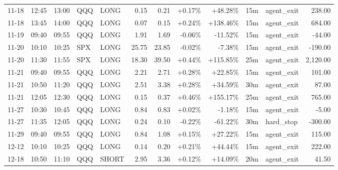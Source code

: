 \documentclass[11pt,a4paper]{article}
\begin{document}
\begin{center}
\begin{longtable}{>{\color{txtmain}}l l l l l r r r r r >{\color{txtmain}}l r}
11-18 & 12:45 & 13:00 & QQQ & LONG & 0.15 & 0.21 & \textcolor{wingreen}{+0.17\%} & \textcolor{wingreen}{+48.28\%} & 15m & agent\_exit & \textcolor{wingreen}{238.00} \\
11-18 & 13:45 & 14:00 & QQQ & LONG & 0.07 & 0.15 & \textcolor{wingreen}{+0.24\%} & \textcolor{wingreen}{+138.46\%} & 15m & agent\_exit & \textcolor{wingreen}{684.00} \\
11-19 & 09:40 & 09:55 & QQQ & LONG & 1.91 & 1.69 & \textcolor{lossred}{-0.06\%} & \textcolor{lossred}{-11.52\%} & 15m & agent\_exit & \textcolor{lossred}{-44.00} \\
11-20 & 10:10 & 10:25 & SPX & LONG & 25.75 & 23.85 & \textcolor{lossred}{-0.02\%} & \textcolor{lossred}{-7.38\%} & 15m & agent\_exit & \textcolor{lossred}{-190.00} \\
11-20 & 11:30 & 11:55 & SPX & LONG & 18.30 & 39.50 & \textcolor{wingreen}{+0.44\%} & \textcolor{wingreen}{+115.85\%} & 25m & agent\_exit & \textcolor{wingreen}{2,120.00} \\
11-21 & 09:40 & 09:55 & QQQ & LONG & 2.21 & 2.71 & \textcolor{wingreen}{+0.28\%} & \textcolor{wingreen}{+22.85\%} & 15m & agent\_exit & \textcolor{wingreen}{101.00} \\
11-21 & 10:50 & 11:20 & QQQ & LONG & 2.51 & 3.38 & \textcolor{wingreen}{+0.28\%} & \textcolor{wingreen}{+34.59\%} & 30m & agent\_exit & \textcolor{wingreen}{87.00} \\
11-21 & 12:05 & 12:30 & QQQ & LONG & 0.15 & 0.37 & \textcolor{wingreen}{+0.46\%} & \textcolor{wingreen}{+155.17\%} & 25m & agent\_exit & \textcolor{wingreen}{765.00} \\
11-27 & 10:30 & 10:45 & QQQ & LONG & 0.84 & 0.83 & \textcolor{wingreen}{+0.02\%} & \textcolor{lossred}{-1.18\%} & 15m & agent\_exit & \textcolor{lossred}{-5.00} \\
11-27 & 11:35 & 12:05 & QQQ & LONG & 0.24 & 0.10 & \textcolor{lossred}{-0.22\%} & \textcolor{lossred}{-61.22\%} & 30m & hard\_stop & \textcolor{lossred}{-300.00} \\
11-29 & 09:40 & 09:55 & QQQ & LONG & 0.84 & 1.08 & \textcolor{wingreen}{+0.15\%} & \textcolor{wingreen}{+27.22\%} & 15m & agent\_exit & \textcolor{wingreen}{115.00} \\
12-12 & 10:10 & 10:25 & QQQ & LONG & 0.14 & 0.20 & \textcolor{wingreen}{+0.21\%} & \textcolor{wingreen}{+44.44\%} & 15m & agent\_exit & \textcolor{wingreen}{222.00} \\
12-18 & 10:50 & 11:10 & QQQ & SHORT & 2.95 & 3.36 & \textcolor{wingreen}{+0.12\%} & \textcolor{wingreen}{+14.09\%} & 20m & agent\_exit & \textcolor{wingreen}{41.50} \\

\end{longtable}
\end{center}
\end{document}
